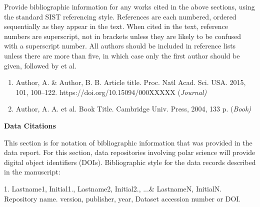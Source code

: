 \documentclass[english]{article}
\begin{document}
 Provide bibliographic information for any works cited in the above sections, using the standard SIST referencing style.
 References are each numbered, ordered sequentially as they appear in the text.
 When cited in the text, reference numbers are superscript, not in brackets unless they are likely to be confused with a superscript number.
 All authors should be included in reference lists unless there are more than five, in which case only the first author should be given, followed by et al.

\begin{enumerate}
\item Author, A. \& Author, B. B. Article title. Proc. Natl Acad. Sci. USA. 2015, 101, 100–122. https://doi.org/10.15094/000XXXXX (\it Journal)
\item Author, A. A. et al. Book Title. Cambridge Univ. Press, 2004, 133 p. (\it Book)
\end{enumerate}

\begin{center}
{\bf Data Citations}
\end{center}

This section is for notation of bibliographic information that was provided in the data report. For this section, data repositories involving polar science will provide digital object identifiers (DOIs).
Bibliographic style for the data records described in the manuscript:

1. Lastname1, Initial1., Lastname2, Initial2., ...\& LastnameN, InitialN. Repository name. version, publisher, year, Dataset accession number or DOI.
\end{document}

